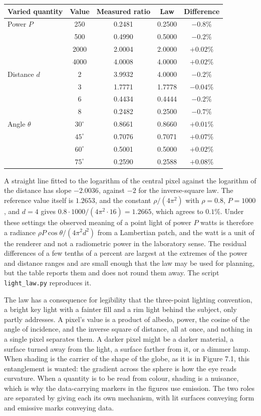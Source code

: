 \begin{center}
\begin{tabular}{@{}lcccc@{}}
\toprule
Varied quantity & Value & Measured ratio & Law & Difference\\
\midrule
Power $P$ & 250 & 0.2481 & 0.2500 & $-0.8\%$\\
 & 500 & 0.4990 & 0.5000 & $-0.2\%$\\
 & 2000 & 2.0004 & 2.0000 & $+0.02\%$\\
 & 4000 & 4.0008 & 4.0000 & $+0.02\%$\\
Distance $d$ & 2 & 3.9932 & 4.0000 & $-0.2\%$\\
 & 3 & 1.7771 & 1.7778 & $-0.04\%$\\
 & 6 & 0.4434 & 0.4444 & $-0.2\%$\\
 & 8 & 0.2482 & 0.2500 & $-0.7\%$\\
Angle $\theta$ & $30^\circ$ & 0.8661 & 0.8660 & $+0.01\%$\\
 & $45^\circ$ & 0.7076 & 0.7071 & $+0.07\%$\\
 & $60^\circ$ & 0.5001 & 0.5000 & $+0.02\%$\\
 & $75^\circ$ & 0.2590 & 0.2588 & $+0.08\%$\\
\bottomrule
\end{tabular}
\end{center}

A straight line fitted to the logarithm of the central pixel against the logarithm of the distance has slope $-2.0036$, against $-2$ for the inverse-square law. The reference value itself is $1.2653$, and the constant $\rho/(4\pi^2)$ with $\rho=0.8$, $P=1000$, and $d=4$ gives $0.8\cdot1000/(4\pi^2\cdot16)=1.2665$, which agrees to $0.1\%$. Under these settings the observed meaning of a point light of power $P$ watts is therefore a radiance $\rho P\cos\theta/(4\pi^2d^2)$ from a Lambertian patch, and the watt is a unit of the renderer and not a radiometric power in the laboratory sense. The residual differences of a few tenths of a percent are largest at the extremes of the power and distance ranges and are small enough that the law may be used for planning, but the table reports them and does not round them away. The script \texttt{light\_law.py} reproduces it.

The law has a consequence for legibility that the three-point lighting convention, a bright key light with a fainter fill and a rim light behind the subject, only partly addresses. A pixel's value is a product of albedo, power, the cosine of the angle of incidence, and the inverse square of distance, all at once, and nothing in a single pixel separates them. A darker pixel might be a darker material, a surface turned away from the light, a surface farther from it, or a dimmer lamp. When shading is the carrier of the shape of the globe, as it is in Figure 7.1, this entanglement is wanted: the gradient across the sphere is how the eye reads curvature. When a quantity is to be read from colour, shading is a nuisance, which is why the data-carrying markers in the figures use emission. The two roles are separated by giving each its own mechanism, with lit surfaces conveying form and emissive marks conveying data.

